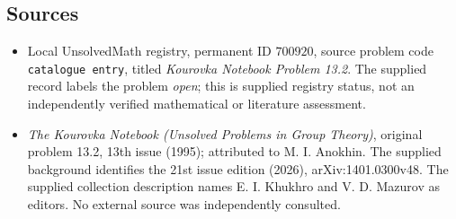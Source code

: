 \documentclass[11pt]{article}
\begin{document}
\subsection{Sources}
\begin{itemize}
\item Local UnsolvedMath registry, permanent ID \(700920\), source problem code \texttt{catalogue entry}, titled \emph{Kourovka Notebook Problem 13.2}. The supplied record labels the problem \emph{open}; this is supplied registry status, not an independently verified mathematical or literature assessment.
\item \emph{The Kourovka Notebook (Unsolved Problems in Group Theory)}, original problem 13.2, 13th issue (1995); attributed to M. I. Anokhin. The supplied background identifies the 21st issue edition (2026), arXiv:1401.0300v48. The supplied collection description names E. I. Khukhro and V. D. Mazurov as editors. No external source was independently consulted.
\end{itemize}
\end{document}
